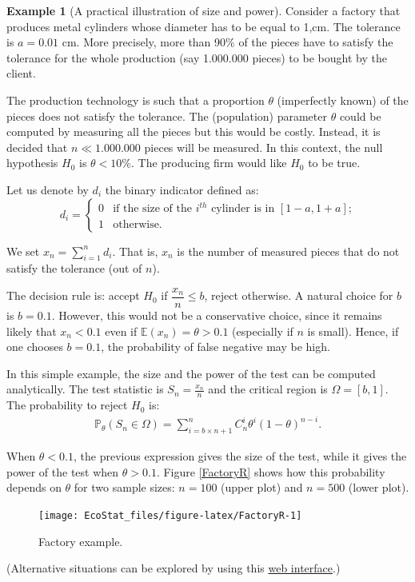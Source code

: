 \documentclass[
  12pt,
]{book}
\theoremstyle{definition}
\theoremstyle{definition}
\newtheorem{example}{Example}[chapter]
\theoremstyle{definition}
\theoremstyle{definition}
\theoremstyle{remark}
\begin{document}
\begin{example}[A practical illustration of size and power]
\protect\hypertarget{exm:Factory}{}\label{exm:Factory}Consider a factory that produces metal cylinders whose diameter has to be equal to 1,cm. The tolerance is \(a=0.01\) cm. More precisely, more than 90\% of the pieces have to satisfy the tolerance for the whole production (say 1.000.000 pieces) to be bought by the client.

The production technology is such that a proportion \(\theta\) (imperfectly known) of the pieces does not satisfy the tolerance. The (population) parameter \(\theta\) could be computed by measuring all the pieces but this would be costly. Instead, it is decided that \(n \ll 1.000.000\) pieces will be measured. In this context, the null hypothesis \(H_0\) is \(\theta < 10\%\). The producing firm would like \(H_0\) to be true.

Let us denote by \(d_i\) the binary indicator defined as:
\[
d_i = \left\{
\begin{array}{cll}
0 & \mbox{if the size of the $i^{th}$ cylinder is in $[1-a,1+a]$;}\\
1 & \mbox{otherwise.}
\end{array}
\right.
\]

We set \(x_n=\sum_{i=1}^n d_i\). That is, \(x_n\) is the number of measured pieces that do not satisfy the tolerance (out of \(n\)).

The decision rule is: accept \(H_0\) if \(\dfrac{x_n}{n} \le b\), reject otherwise. A natural choice for \(b\) is \(b=0.1\). However, this would not be a conservative choice, since it remains likely that \(x_n<0.1\) even if \(\mathbb{E}(x_n)=\theta>0.1\) (especially if \(n\) is small). Hence, if one chooses \(b=0.1\), the probability of false negative may be high.

In this simple example, the size and the power of the test can be computed analytically. The test statistic is \(S_n=\frac{x_n}{n}\) and the critical region is \(\Omega = [b,1]\). The probability to reject \(H_0\) is:
\begin{eqnarray*}
\mathbb{P}_\theta(S_n \in \Omega) = \sum_{i=b \times n+1}^{n}C_{n}^i\theta^i(1-\theta)^{n-i}.
\end{eqnarray*}

When \(\theta<0.1\), the previous expression gives the size of the test, while it gives the power of the test when \(\theta>0.1\). Figure \ref{FactoryR} shows how this probability depends on \(\theta\) for two sample sizes: \(n=100\) (upper plot) and \(n=500\) (lower plot).

\begin{figure}
\texttt{[image: EcoStat\_files/figure-latex/FactoryR-1]} \caption{Factory example.}\label{fig:FactoryR}
\end{figure}

(Alternative situations can be explored by using this \href{https://jrenne.shinyapps.io/Factory/}{web interface}.)
\end{example}
\end{document}
